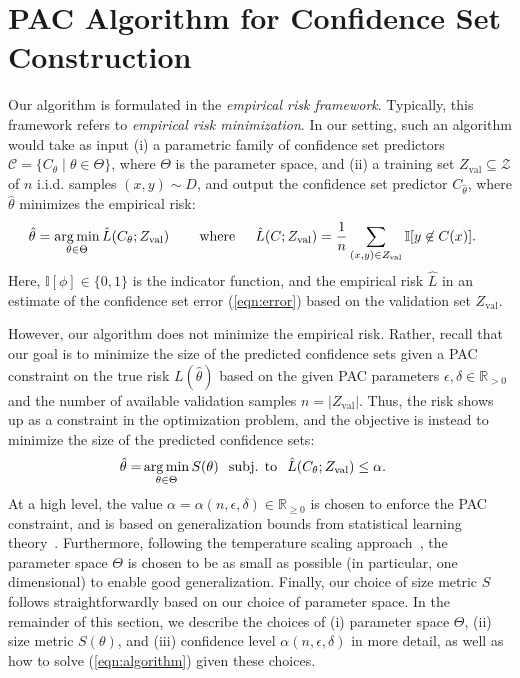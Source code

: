 \documentclass{article} \usepackage{iclr2020_conference,times}
\renewcommand{\(}						{\left(}
\renewcommand{\)}						{\right)}
\renewcommand{\[}						{\left[}
\renewcommand{\]}						{\right]}
\newcommand{\<}						{\left<}
\renewcommand{\>}						{\right>}
\begin{document}
 

\section{PAC Algorithm for Confidence Set Construction}
\label{sec:algorithm}

Our algorithm is formulated in the \emph{empirical risk framework}. Typically, this framework refers to \emph{empirical risk minimization}. In our setting, such an algorithm would take as input (i) a parametric family of confidence set predictors $\mathcal{C}=\{C_{\theta}\mid\theta\in\Theta\}$, where $\Theta$ is the parameter space, and (ii) a training set $Z_{\text{val}}\subseteq\mathcal{Z}$ of $n$ i.i.d. samples $(x,y)\sim D$, and output the confidence set predictor $C_{\hat{\theta}}$, where $\hat{\theta}$ minimizes the empirical risk:
\begin{align*}
\hat{\theta}&=\operatorname*{\arg\min}_{\theta\in\Theta}\hat{L}(C_{\theta};Z_{\text{val}})
\hspace{0.3in}\text{where}\hspace{0.2in}
\hat{L}(C;Z_{\text{val}})=\frac{1}{n}\sum_{(x,y)\in Z_{\text{val}}}\mathbb{I}[y\not\in C(x)].
\end{align*}
Here, $\mathbb{I}[\phi]\in\{0,1\}$ is the indicator function, and the empirical risk $\hat{L}$ in an estimate of the confidence set error (\ref{eqn:error}) based on the validation set $Z_{\text{val}}$.

However, our algorithm does not minimize the empirical risk. Rather, recall that our goal is to minimize the size of the predicted confidence sets given a PAC constraint on the true risk $L(\hat{\theta})$ based on the given PAC parameters $\epsilon,\delta\in\mathbb{R}_{>0}$ and the number of available validation samples $n=|Z_{\text{val}}|$. Thus, the risk shows up as a constraint in the optimization problem, and the objective is instead to minimize the size of the predicted confidence sets:
\begin{align}
\label{eqn:algorithm}
\hat{\theta}=&\operatorname*{\arg\min}_{\theta\in\Theta}S(\theta)
\hspace{0.1in}\text{subj. to}\hspace{0.1in}\hat{L}(C_{\theta};Z_{\text{val}})\le\alpha.
\end{align}
At a high level, the value $\alpha=\alpha(n,\epsilon,\delta)\in\mathbb{R}_{\ge0}$ is chosen to enforce the PAC constraint, and is based on generalization bounds from statistical learning theory~\citep{valiant1984theory}. Furthermore, following the temperature scaling approach~\citep{platt1999probabilistic}, the parameter space $\Theta$ is chosen to be as small as possible (in particular, one dimensional) to enable good generalization. Finally, our choice of size metric $S$ follows straightforwardly based on our choice of parameter space. In the remainder of this section, we describe the choices of (i) parameter space $\Theta$, (ii) size metric $S(\theta)$, and (iii) confidence level $\alpha(n,\epsilon,\delta)$ in more detail, as well as how to solve (\ref{eqn:algorithm}) given these choices.
\end{document}
